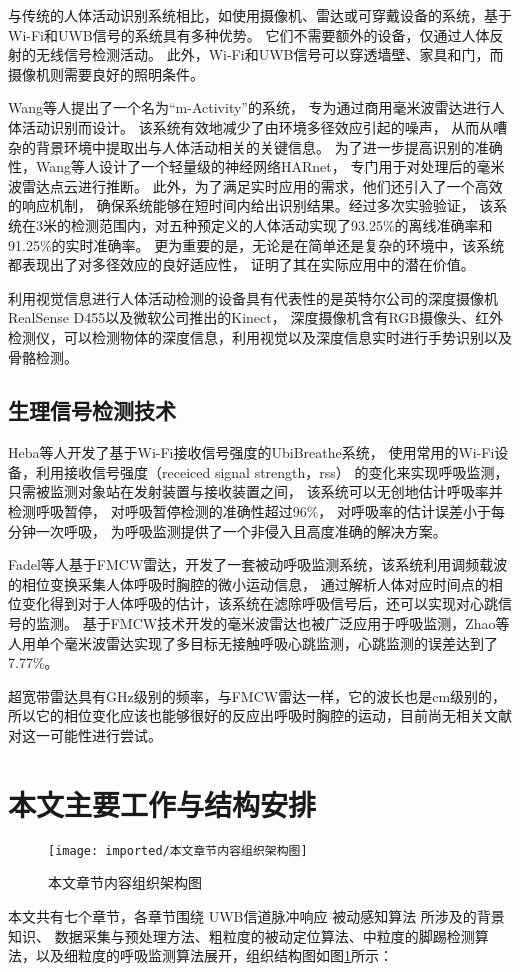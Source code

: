 与传统的人体活动识别系统相比，如使用摄像机、雷达或可穿戴设备的系统，基于Wi-Fi和UWB信号的系统具有多种优势。
它们不需要额外的设备，仅通过人体反射的无线信号检测活动。
此外，Wi-Fi和UWB信号可以穿透墙壁、家具和门，而摄像机则需要良好的照明条件。 

Wang等人\cite{Wang_Wifi_HAR}提出了一个名为“m-Activity”的系统，
专为通过商用毫米波雷达进行人体活动识别而设计。
该系统有效地减少了由环境多径效应引起的噪声，
从而从嘈杂的背景环境中提取出与人体活动相关的关键信息。
为了进一步提高识别的准确性，Wang等人设计了一个轻量级的神经网络HARnet，
专门用于对处理后的毫米波雷达点云进行推断。
此外，为了满足实时应用的需求，他们还引入了一个高效的响应机制，
确保系统能够在短时间内给出识别结果。经过多次实验验证，
该系统在3米的检测范围内，对五种预定义的人体活动实现了93.25\%的离线准确率和91.25\%的实时准确率。
更为重要的是，无论是在简单还是复杂的环境中，该系统都表现出了对多径效应的良好适应性，
证明了其在实际应用中的潜在价值。

利用视觉信息进行人体活动检测的设备具有代表性的是英特尔公司的深度摄像机RealSense D455以及微软公司推出的Kinect，
深度摄像机含有RGB摄像头、红外检测仪，可以检测物体的深度信息，利用视觉以及深度信息实时进行手势识别以及骨骼检测。

\subsection{生理信号检测技术}
Heba等人\cite{UbiBreathe}开发了基于Wi-Fi接收信号强度的UbiBreathe系统，
使用常用的Wi-Fi设备，利用接收信号强度（receiced signal strength，rss）
的变化来实现呼吸监测，只需被监测对象站在发射装置与接收装置之间，
该系统可以无创地估计呼吸率并检测呼吸暂停，
对呼吸暂停检测的准确性超过96\%，
对呼吸率的估计误差小于每分钟一次呼吸，
为呼吸监测提供了一个非侵入且高度准确的解决方案。

Fadel等人\cite{Adib_Breathe}基于FMCW雷达，开发了一套被动呼吸监测系统，该系统利用调频载波的相位变换采集人体呼吸时胸腔的微小运动信息，
通过解析人体对应时间点的相位变化得到对于人体呼吸的估计，该系统在滤除呼吸信号后，还可以实现对心跳信号的监测。
基于FMCW技术开发的毫米波雷达也被广泛应用于呼吸监测，Zhao等人\cite{zhao_Breathe}用单个毫米波雷达实现了多目标无接触呼吸心跳监测，心跳监测的误差达到了7.77\%。

超宽带雷达具有GHz级别的频率，与FMCW雷达一样，它的波长也是cm级别的，所以它的相位变化应该也能够很好的反应出呼吸时胸腔的运动，目前尚无相关文献对这一可能性进行尝试。

\section{本文主要工作与结构安排}
\begin{figure}[htbp]
    \centering
    \texttt{[image: imported/本文章节内容组织架构图]}
    \caption{\label{fig:structure}本文章节内容组织架构图}
\end{figure}
本文共有七个章节，各章节围绕 UWB信道脉冲响应 被动感知算法 所涉及的背景知识、
数据采集与预处理方法、粗粒度的被动定位算法、中粒度的脚踢检测算法，以及细粒度的呼吸监测算法展开，组织结构图如图\ref{fig:structure}所示：


